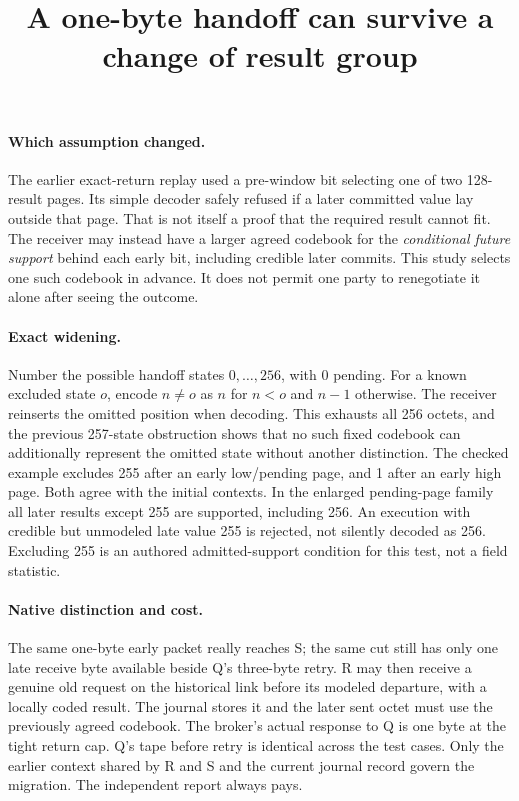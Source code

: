 \documentclass{article}
\title{A one-byte handoff can survive a change of result group}
\author{}
\date{}
\begin{document}
\maketitle
\paragraph{Which assumption changed.}
The earlier exact-return replay used a pre-window bit selecting
one of two 128-result pages. Its simple decoder safely refused if
a later committed value lay outside that page. That is not itself
a proof that the required result cannot fit. The receiver may
instead have a larger agreed codebook for the \emph{conditional
future support} behind each early bit, including credible later
commits. This study selects one such codebook in advance. It does
not permit one party to renegotiate it alone after seeing the
outcome.

\paragraph{Exact widening.}
Number the possible handoff states \(0,\ldots,256\), with \(0\)
pending. For a known excluded state \(o\), encode \(n\ne o\) as
\(n\) for \(n<o\) and \(n-1\) otherwise. The receiver reinserts
the omitted position when decoding. This exhausts all 256 octets,
and the previous 257-state obstruction shows that no such fixed
codebook can additionally represent the omitted state without
another distinction. The checked example excludes 255 after an
early low/pending page, and 1 after an early high page. Both agree
with the initial contexts. In the enlarged pending-page family
all later results except 255 are supported, including 256.
An execution with credible but unmodeled late value 255 is rejected,
not silently decoded as 256. Excluding 255 is an authored
admitted-support condition for this test, not a field statistic.

\paragraph{Native distinction and cost.}
The same one-byte early packet really reaches S; the same cut still
has only one late receive byte available beside Q's three-byte
retry. R may then receive a genuine old request on the historical
link before its modeled departure, with a locally coded result.
The journal stores it and the later sent octet must use the
previously agreed codebook. The broker's actual response to Q is
one byte at the tight return cap. Q's tape before retry is
identical across the test cases. Only the earlier context shared by
R and S and the current journal record govern the migration.
The independent report always pays.
\end{document}
